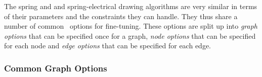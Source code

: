 The spring and and spring-electrical drawing algorithms are very similar
in terms of their parameters and the constraints they can handle. They
thus share a number of common \tikzname\ options for fine-tuning. These
options are split up into \emph{graph options} that can be specified
once for a graph, \emph{node options} that can be specified for each
node and \emph{edge options} that can be specified for each edge.

\subsubsection{Common Graph Options}

%
%

